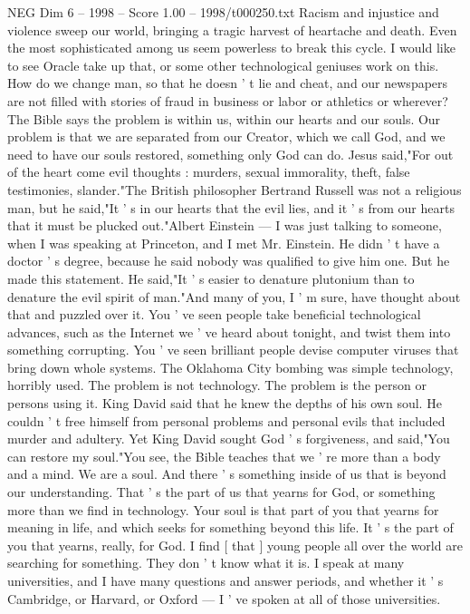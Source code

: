 \begin{textsample}{NEG Dim 6 – 1998 – Score 1.00 – 1998/t000250.txt}
Racism and injustice and violence sweep our world, bringing a tragic harvest of heartache and death.
Even the most sophisticated among us seem powerless to break this cycle.
I would like to see Oracle take up that, or some other technological geniuses work on this.
How do we change man, so that he doesn ' t lie and cheat, and our newspapers are not filled with stories of fraud in business or labor or athletics or wherever?
The Bible says the problem is within us, within our hearts and our souls.
Our problem is that we are separated from our Creator, which we call God, and we need to have our souls restored, something only God can do.
Jesus said,"For out of the heart come evil thoughts : murders, sexual immorality, theft, false testimonies, slander."The British philosopher Bertrand Russell was not a religious man, but he said,"It ' s in our hearts that the evil lies, and it ' s from our hearts that it must be plucked out."Albert Einstein — I was just talking to someone, when I was speaking at Princeton, and I met Mr.
Einstein.
He didn ' t have a doctor ' s degree, because he said nobody was qualified to give him one.
But he made this statement.
He said,"It ' s easier to denature plutonium than to denature the evil spirit of man."And many of you, I ' m sure, have thought about that and puzzled over it.
You ' ve seen people take beneficial technological advances, such as the Internet we ' ve heard about tonight, and twist them into something corrupting.
You ' ve seen brilliant people devise computer viruses that bring down whole systems.
The Oklahoma City bombing was simple technology, horribly used.
The problem is not technology.
The problem is the person or persons using it.
King David said that he knew the depths of his own soul.
He couldn ' t free himself from personal problems and personal evils that included murder and adultery.
Yet King David sought God ' s forgiveness, and said,"You can restore my soul."You see, the Bible teaches that we ' re more than a body and a mind.
We are a soul.
And there ' s something inside of us that is beyond our understanding.
That ' s the part of us that yearns for God, or something more than we find in technology.
Your soul is that part of you that yearns for meaning in life, and which seeks for something beyond this life.
It ' s the part of you that yearns, really, for God.
I find [ that ] young people all over the world are searching for something.
They don ' t know what it is.
I speak at many universities, and I have many questions and answer periods, and whether it ' s Cambridge, or Harvard, or Oxford — I ' ve spoken at all of those universities.

\end{textsample}
